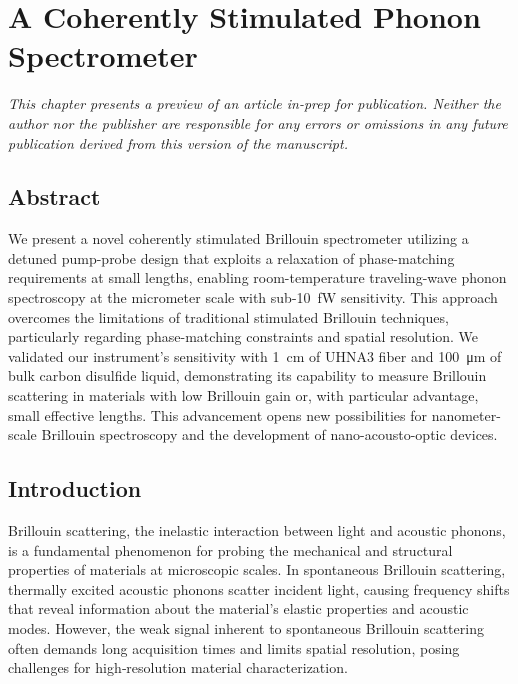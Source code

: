 \setcounter{rownumber}{0}
\chapter{A Coherently Stimulated Phonon Spectrometer}
\label{ch:CoBS}
\acresetall

\hfill

\textit{This chapter presents a preview of an article in-prep for publication. Neither the author nor the publisher are responsible for any errors or omissions in any future publication derived from this version of the manuscript.}

\doublespacing

\section{Abstract}
We present a novel coherently stimulated Brillouin spectrometer utilizing a detuned pump-probe design that exploits a relaxation of phase-matching requirements at small lengths, enabling room-temperature traveling-wave phonon spectroscopy at the micrometer scale with sub-\SI{10}{\femto\watt} sensitivity. This approach overcomes the limitations of traditional stimulated Brillouin techniques, particularly regarding phase-matching constraints and spatial resolution. We validated our instrument’s sensitivity with \SI{1}{\centi\meter} of \ac{UHNA3} fiber and \SI{100}{\micro\meter} of bulk carbon disulfide liquid, demonstrating its capability to measure Brillouin scattering in materials with low Brillouin gain or, with particular advantage, small effective lengths. This advancement opens new possibilities for nanometer-scale Brillouin spectroscopy and the development of nano-acousto-optic devices.

\section{Introduction}
\label{sec:Introduction}

Brillouin scattering, the inelastic interaction between light and acoustic phonons, is a fundamental phenomenon for probing the mechanical and structural properties of materials at microscopic scales. In spontaneous Brillouin scattering, thermally excited acoustic phonons scatter incident light, causing frequency shifts that reveal information about the material’s elastic properties and acoustic modes. \cite{boyd2020nonlinear} However, the weak signal inherent to spontaneous Brillouin scattering often demands long acquisition times and limits spatial resolution, posing challenges for high‐resolution material characterization.

